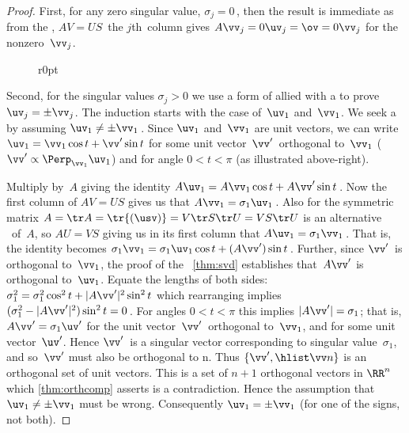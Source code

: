 \begin{proof} 
First, for any zero singular value, \(\sigma_j=0\)\,, then the result is immediate as from the \svd, \(AV=US\)\, the \(j\)th~column gives \(A\vv_j=0\uv_j=\ov=0\vv_j\) for the nonzero~\(\vv_j\).

\begin{wrapfigure}r{0pt}
\end{wrapfigure}
Second, for the singular values \(\sigma_j>0\) we use a form of  allied with a  to prove \(\uv_j=\pm \vv_j\).
The induction starts with the case of~\(\uv_1\) and~\(\vv_1\).
We seek a  by assuming \(\uv_1\neq\pm\vv_1\)\,. Since \(\uv_1\) and~\(\vv_1\) are unit vectors, we can write \(\uv_1=\vv_1\cos t+\vv'\sin t\) for some unit vector~\(\vv'\)\ orthogonal to~\(\vv_1\) (\(\vv'\propto\Perp_{\vv_1}\uv_1\)) and for angle \(0< t<\pi\) (as illustrated above-right).
\begin{comment}
Should eliminate the possibility of \(t=\pi\)??
\end{comment}
Multiply by~\(A\) giving the identity \(A\uv_1=A\vv_1\cos t+A\vv'\sin t\)\,.
Now the first column of \(AV=US\) gives us that \(A\vv_1=\sigma_1\uv_1\)\,.
Also for the symmetric matrix \(A=\tr A=\tr{(\usv)}=V\tr S\tr U=VS\tr U\) is an alternative \svd\ of~\(A\),  
so \(AU=VS\) giving us in its first column that \(A\uv_1=\sigma_1\vv_1\)\,.
That is, the identity becomes \(\sigma_1\vv_1=\sigma_1\uv_1\cos t+(A\vv')\sin t\)\,.
Further, since \(\vv'\)~is orthogonal to~\(\vv_1\), the proof of the \svd\ \cref{thm:svd} establishes that~\(A\vv'\) is orthogonal to~\(\uv_1\).  
Equate the lengths of both sides: \(\sigma_1^2=\sigma_1^2\cos^2 t+|A\vv'|^2\sin^2 t\) which rearranging implies \((\sigma_1^2-|A\vv'|^2) \sin^2 t=0\)\,.
For angles \(0< t<\pi\) this implies \(|A\vv'|=\sigma_1\); that is, \(A\vv'=\sigma_1\uv'\) for the unit vector~\(\vv'\)\ orthogonal to~\(\vv_1\), and for some unit vector~\(\uv'\).
Hence \(\vv'\)~is a singular vector corresponding to singular value~\(\sigma_1\), and so~\(\vv'\) must also be orthogonal to \hlist[2]\vv n. Thus \(\{\vv',\hlist\vv n\}\) is an orthogonal set of unit vectors.
This is a set of \(n+1\) orthogonal vectors in \(\RR^n\) which \cref{thm:orthcomp} asserts is a contradiction.  
Hence the assumption that \(\uv_1\neq\pm\vv_1\) must be wrong.  
Consequently \(\uv_1=\pm\vv_1\) (for one of the signs, not both).


\end{proof}
